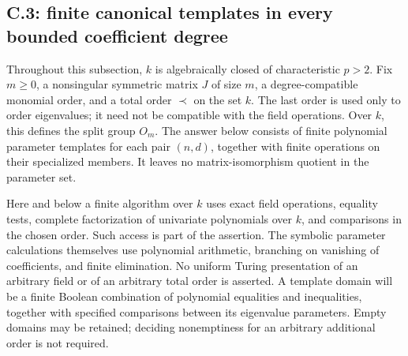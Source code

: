 \subsection{C.3: finite canonical templates in every bounded coefficient degree}
\label{C:canonical-subsection}

Throughout this subsection, $k$ is algebraically closed of characteristic
$p>2$. Fix $m\geq0$, a nonsingular symmetric matrix $J$ of size $m$, a
degree-compatible monomial order, and a total order $\prec$ on the set $k$.
The last order is used only to order eigenvalues; it need not be compatible
with the field operations. Over $k$, this defines the split group $O_m$.
The answer below consists of finite polynomial parameter templates for each
pair $(n,d)$, together with finite operations on their specialized members.
It leaves no matrix-isomorphism quotient in the parameter set.

Here and below a finite algorithm over $k$ uses exact field operations,
equality tests, complete factorization of univariate polynomials over $k$,
and comparisons in the chosen order. Such access is part of the assertion.
The symbolic parameter calculations themselves use polynomial arithmetic,
branching on vanishing of coefficients, and finite elimination. No uniform
Turing presentation of an arbitrary field or of an arbitrary total order is
asserted. A template domain will be a finite Boolean combination of
polynomial equalities and inequalities, together with specified comparisons
between its eigenvalue parameters. Empty domains may be retained; deciding
nonemptiness for an arbitrary additional order is not required.

